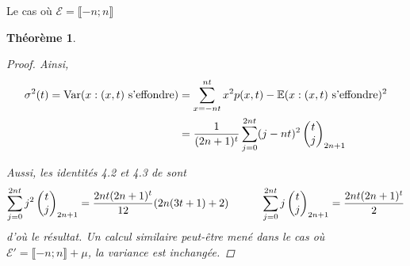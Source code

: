\documentclass{article}
\newtheorem{theorem}{Théorème}[section]
\begin{document}
\begin{section}{Le cas où $\mathcal{E} = \llbracket -n; n\rrbracket$}
\begin{theorem}
\begin{proof}
		Ainsi, \begin{align*}
			\sigma^2(t) = \textup{Var}(x : (x,t) \textup{ s'effondre}) &=\sum_{x=-nt}^{nt} x^2 p(x,t) - \mathbb{E}(x : (x,t) \textup{ s'effondre})^2\\& = \frac{1}{(2n+1)^t} \sum_{j=0}^{2nt} (j-nt)^2 \begin{pmatrix}t\\j\end{pmatrix}_{2n+1} 
		\end{align*}

		Aussi, les identités 4.2 et 4.3 de \cite{h2} sont
		\begin{align*}
			\sum_{j=0}^{2n t} j^2 \begin{pmatrix} t\\j\end{pmatrix}_{2n+1} = \frac{2nt (2n+1)^t}{12} (2n (3t+1)+2) \indent \indent \sum_{j=0}^{2n t} j \begin{pmatrix} t\\j \end{pmatrix}_{2n+1}  = \frac{2 nt (2n+1)^t}{2}
		\end{align*}
		d'où le résultat. Un calcul similaire peut-être mené dans le cas où $\mathcal{E}'=\llbracket -n;n\rrbracket + \mu$, la variance est inchangée.
	\end{proof}
\end{theorem}
%

\end{section}
\end{document}
